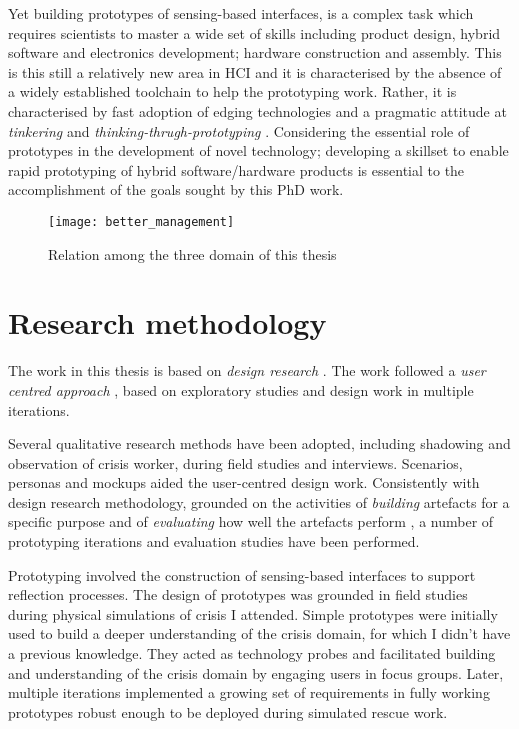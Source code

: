 Yet building prototypes of sensing-based interfaces, is a complex task which requires scientists to master a wide set of skills including product design, hybrid software and electronics development; hardware construction and assembly. This is this still a relatively new area in HCI and it is characterised by the absence of a widely established toolchain to help the prototyping work. Rather, it is characterised by fast adoption of edging technologies and a pragmatic attitude at \emph{tinkering} and \emph{thinking-thrugh-prototyping} \autocite{Klemmer:2006ez}. Considering the essential role of prototypes in the development of novel technology; developing a skillset to enable rapid prototyping of hybrid software/hardware products is essential to the accomplishment of the goals sought by this PhD work.
\begin{figure}
	[tbh] \centering 
	\texttt{[image: better\_management]} \caption{Relation among the three domain of this thesis} \label{fig:topic_relation} 
\end{figure}

\section{Research methodology}\label{research-methodology}

The work in this thesis is based on \emph{design research} \autocites{Hevner:2010fy}{March:1995gm}. The work followed a \emph{user centred approach} \autocites{MAGUIRE:2001dp}{Gulliksen:2003hd}, based on exploratory studies and design work in multiple iterations.

Several qualitative research methods \autocite{robson1993real} have been adopted, including shadowing and observation of crisis worker, during field studies and interviews. Scenarios, personas and mockups aided the user-centred design work. Consistently with design research methodology, grounded on the activities of \emph{building} artefacts for a specific purpose and of \emph{evaluating} how well the artefacts perform \autocite{March:1995gm}, a number of prototyping iterations and evaluation studies have been performed.

Prototyping involved the construction of sensing-based interfaces to support reflection processes. The design of prototypes was grounded in field studies during physical simulations of crisis I attended. Simple prototypes were initially used to build a deeper understanding of the crisis domain, for which I didn't have a previous knowledge. They acted as technology probes \autocite{Hutchinson:2003il} and facilitated building and understanding of the crisis domain by engaging users in focus groups. Later, multiple iterations implemented a growing set of requirements in fully working prototypes robust enough to be deployed during simulated rescue work.

